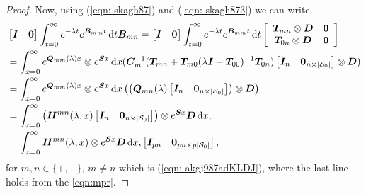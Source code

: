\begin{proof}
Now, using (\ref{eqn: skagh87}) and (\ref{eqn: skagh873}) we can write 
\begin{align}
	\nonumber&\begin{bmatrix} \boldsymbol I & \boldsymbol 0  \end{bmatrix}\int_{t=0}^\infty e^{-\lambda t} e^{\boldsymbol{B}_{mm}t} \, \mathrm{d} t \boldsymbol{B}_{m{n}} = \begin{bmatrix} \boldsymbol I & \boldsymbol 0  \end{bmatrix}\int_{t=0}^\infty e^{-\lambda t} e^{\boldsymbol{B}_{mm}t} \, \mathrm{d} t  \left[\begin{array}{cc} \boldsymbol{T}_{mn}\otimes \boldsymbol{D} & \boldsymbol 0 \\ \boldsymbol T_{0n}\otimes \boldsymbol D & \boldsymbol 0 \end{array}\right]
	\\&= \int_{x=0}^\infty e^{\boldsymbol Q_{mm}(\lambda)x}\otimes  e^{\boldsymbol S x}\, \mathrm{d} x (\boldsymbol C_m^{-1}(\boldsymbol{T}_{mn} + \boldsymbol T_{m0}(\lambda \boldsymbol I - \boldsymbol T_{00})^{-1}\boldsymbol T_{0n}) \begin{bmatrix} \boldsymbol I_n & \boldsymbol 0_{n\times |\mathcal{S}_0|} \end{bmatrix} \otimes \boldsymbol D) \nonumber
	\\&= \int_{x=0}^\infty e^{\boldsymbol Q_{mm}(\lambda)x}\otimes  e^{\boldsymbol S x}\, \mathrm{d} x \left( \left( \boldsymbol{Q}_{mn} (\lambda) \begin{bmatrix} \boldsymbol I_n & \boldsymbol 0_{n\times |\mathcal{S}_0|} \end{bmatrix} \right) \otimes \boldsymbol D\right)  \nonumber
	\\&= \int_{x=0}^\infty \left(\boldsymbol H^{mn}(\lambda,x) \begin{bmatrix} \boldsymbol I_n & \boldsymbol 0_{n\times |\mathcal{S}_0|} \end{bmatrix}\right) \otimes  e^{\boldsymbol S x}\boldsymbol D\, \mathrm{d} x,\nonumber
	\\&= \int_{x=0}^\infty \boldsymbol H^{mn}(\lambda,x)  \otimes  e^{\boldsymbol S x}\boldsymbol D\, \mathrm{d} x,\begin{bmatrix} \boldsymbol I_{pn} & \boldsymbol 0_{pn\times p|\mathcal{S}_0|} \end{bmatrix}, \label{eqn: akgj987ad}
\end{align}
for \(m,n\in\{+,-\}\), \(m\neq n\) which is (\ref{eqn: akgj987adKLDJ}), where the last line holds from the \ref{eqn:mpr}. 
\end{proof}